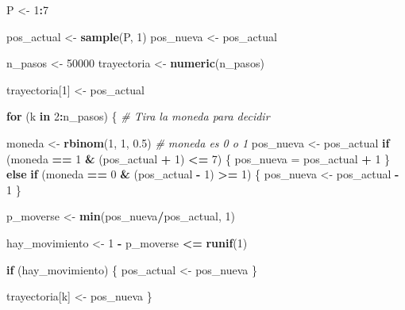 \documentclass[
  12pt,
]{book}
\newenvironment{Shaded}{\begin{snugshade}}{\end{snugshade}}
\newcommand{\CommentTok}[1]{\textcolor[rgb]{0.56,0.35,0.01}{\textit{#1}}}
\newcommand{\ControlFlowTok}[1]{\textcolor[rgb]{0.13,0.29,0.53}{\textbf{#1}}}
\newcommand{\DecValTok}[1]{\textcolor[rgb]{0.00,0.00,0.81}{#1}}
\newcommand{\FloatTok}[1]{\textcolor[rgb]{0.00,0.00,0.81}{#1}}
\newcommand{\KeywordTok}[1]{\textcolor[rgb]{0.13,0.29,0.53}{\textbf{#1}}}
\newcommand{\NormalTok}[1]{#1}
\newcommand{\OperatorTok}[1]{\textcolor[rgb]{0.81,0.36,0.00}{\textbf{#1}}}
\newcommand{\StringTok}[1]{\textcolor[rgb]{0.31,0.60,0.02}{#1}}
\theoremstyle{definition}
\theoremstyle{definition}
\theoremstyle{definition}
\theoremstyle{remark}
\begin{document}
\begin{Shaded}
\begin{Highlighting}[]
\NormalTok{P <-}\StringTok{ }\DecValTok{1}\OperatorTok{:}\DecValTok{7}

\NormalTok{pos_actual <-}\StringTok{ }\KeywordTok{sample}\NormalTok{(P, }\DecValTok{1}\NormalTok{)}
\NormalTok{pos_nueva <-}\StringTok{ }\NormalTok{pos_actual}

\NormalTok{n_pasos <-}\StringTok{ }\DecValTok{50000}
\NormalTok{trayectoria <-}\StringTok{ }\KeywordTok{numeric}\NormalTok{(n_pasos)}

\NormalTok{trayectoria[}\DecValTok{1}\NormalTok{] <-}\StringTok{ }\NormalTok{pos_actual}

\ControlFlowTok{for}\NormalTok{ (k }\ControlFlowTok{in} \DecValTok{2}\OperatorTok{:}\NormalTok{n_pasos) \{}
    \CommentTok{# Tira la moneda para decidir}
    
\NormalTok{    moneda <-}\StringTok{ }\KeywordTok{rbinom}\NormalTok{(}\DecValTok{1}\NormalTok{, }\DecValTok{1}\NormalTok{, }\FloatTok{0.5}\NormalTok{)}
    \CommentTok{# moneda es 0 o 1}
\NormalTok{    pos_nueva <-}\StringTok{ }\NormalTok{pos_actual}
    \ControlFlowTok{if}\NormalTok{ (moneda }\OperatorTok{==}\StringTok{ }\DecValTok{1} \OperatorTok{&}\StringTok{ }\NormalTok{(pos_actual }\OperatorTok{+}\StringTok{ }\DecValTok{1}\NormalTok{) }\OperatorTok{<=}\StringTok{ }\DecValTok{7}\NormalTok{) \{}
\NormalTok{        pos_nueva =}\StringTok{ }\NormalTok{pos_actual }\OperatorTok{+}\StringTok{ }\DecValTok{1}
\NormalTok{    \} }\ControlFlowTok{else} \ControlFlowTok{if}\NormalTok{ (moneda }\OperatorTok{==}\StringTok{ }\DecValTok{0} \OperatorTok{&}\StringTok{ }\NormalTok{(pos_actual }\OperatorTok{-}\StringTok{ }\DecValTok{1}\NormalTok{) }\OperatorTok{>=}\StringTok{ }\DecValTok{1}\NormalTok{) \{}
\NormalTok{        pos_nueva <-}\StringTok{ }\NormalTok{pos_actual }\OperatorTok{-}\StringTok{ }\DecValTok{1}
\NormalTok{    \}}
    
\NormalTok{    p_moverse <-}\StringTok{ }\KeywordTok{min}\NormalTok{(pos_nueva}\OperatorTok{/}\NormalTok{pos_actual, }\DecValTok{1}\NormalTok{)}
    
\NormalTok{    hay_movimiento <-}\StringTok{ }\DecValTok{1} \OperatorTok{-}\StringTok{ }\NormalTok{p_moverse }\OperatorTok{<=}\StringTok{ }\KeywordTok{runif}\NormalTok{(}\DecValTok{1}\NormalTok{)}
    
    \ControlFlowTok{if}\NormalTok{ (hay_movimiento) \{}
\NormalTok{        pos_actual <-}\StringTok{ }\NormalTok{pos_nueva}
\NormalTok{    \}}
    
\NormalTok{    trayectoria[k] <-}\StringTok{ }\NormalTok{pos_nueva}
\NormalTok{\}}
\end{Highlighting}
\end{Shaded}
\end{document}
